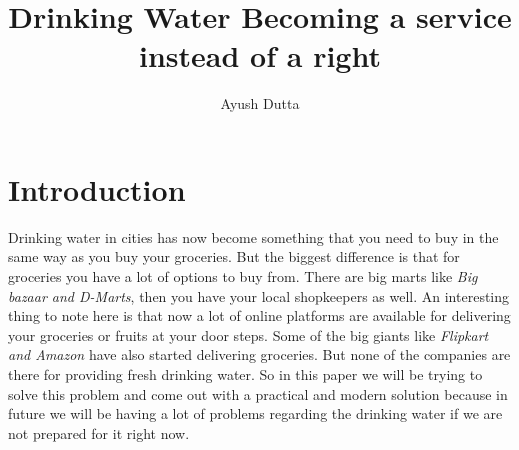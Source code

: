 \documentclass[a4paper, 12pt]{article}
\title{Drinking Water Becoming a service instead of a right}
\author{Ayush Dutta}
\begin{document}
\maketitle

\section{Introduction}
Drinking water in cities has now become something that you need to buy in the same way as you buy your groceries. But the biggest difference is that for groceries you have a lot of options to buy from. There are big marts like
\textit{Big bazaar and D-Marts}, 
then you have your local shopkeepers as well. An interesting thing to note here is that now a lot of online platforms are available for delivering your groceries or fruits at your door steps. Some of the big giants like
\textit{Flipkart and Amazon} 
have also started delivering groceries. But none of the companies are there for providing fresh drinking water. So in this paper we will be trying to solve this problem and come out with a practical and modern solution because in future we will be having a lot of problems regarding the drinking water if we are not prepared for it right now.
\end{document}
